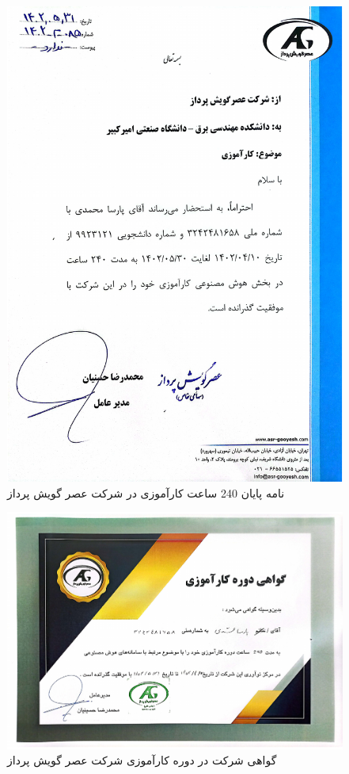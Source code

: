 \begin{figure}[H]
  \centering
  \includegraphics[width=1\textwidth]{letters/240.pdf}
  \caption{
    نامه پایان 240 ساعت کارآموزی در شرکت عصر گویش پرداز
  }
  \label{img:240}
\end{figure}

\begin{figure}[H]
  \centering
  \includegraphics[width=1\textwidth,scale=4]{letters/certificate.pdf}
  \caption{
    گواهی شرکت در دوره کارآموزی شرکت عصر گویش پرداز
  }
  \label{img:certificate}
\end{figure}